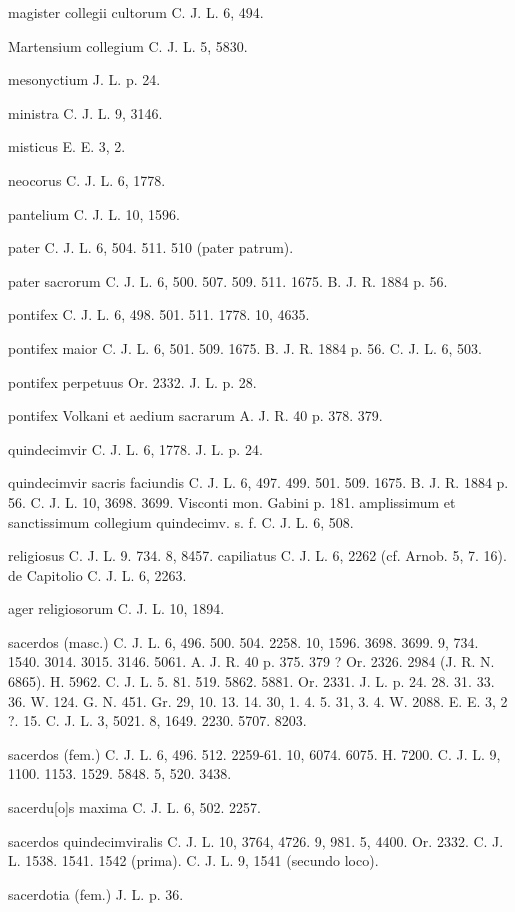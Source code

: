 \documentclass[a4paper, 11pt, oneside, polutonikogreek, german]{article}
\begin{document}
magister collegii cultorum C. J. L. 6, 494.

Martensium collegium C. J. L. 5, 5830.

mesonyctium J. L. p. 24.

ministra C. J. L. 9, 3146.

misticus E. E. 3, 2.

neocorus C. J. L. 6, 1778.

pantelium C. J. L. 10, 1596.

pater C. J. L. 6, 504. 511. 510 (pater patrum).

pater sacrorum C. J. L. 6, 500. 507. 509. 511. 1675. B. J. R. 1884 p. 56.

pontifex C. J. L. 6, 498. 501. 511. 1778. 10, 4635.

pontifex maior C. J. L. 6, 501. 509. 1675. B. J. R. 1884 p. 56. C. J. L. 6, 503.

pontifex perpetuus Or. 2332. J. L. p. 28.

pontifex Volkani et aedium sacrarum A. J. R. 40 p. 378. 379.

quindecimvir C. J. L. 6, 1778. J. L. p. 24.

quindecimvir sacris faciundis C. J. L. 6, 497. 499. 501. 509. 1675. B. J. R. 1884 p. 56. C. J. L. 10, 3698. 3699. Visconti mon. Gabini p. 181. amplissimum et sanctissimum collegium quindecimv. s. f. C. J. L. 6, 508.

religiosus C. J. L. 9. 734. 8, 8457. capiliatus C. J. L. 6, 2262 (cf. Arnob. 5, 7. 16). de Capitolio C. J. L. 6, 2263.

ager religiosorum C. J. L. 10, 1894.

sacerdos (masc.) C. J. L. 6, 496. 500. 504. 2258. 10, 1596. 3698. 3699. 9, 734. 1540. 3014. 3015. 3146. 5061. A. J. R. 40 p. 375. 379 ? Or. 2326. 2984 (J. R. N. 6865). H. 5962. C. J. L. 5. 81. 519. 5862. 5881. Or. 2331. J. L. p. 24. 28. 31. 33. 36. W. 124. G. N. 451. Gr. 29, 10. 13. 14. 30, 1. 4. 5. 31, 3. 4. W. 2088. E. E. 3, 2 ?. 15. C. J. L. 3, 5021. 8, 1649. 2230. 5707. 8203.

sacerdos (fem.) C. J. L. 6, 496. 512. 2259-61. 10, 6074. 6075. H. 7200. C. J. L. 9, 1100. 1153. 1529. 5848. 5, 520. 3438.

sacerdu[o]s maxima C. J. L. 6, 502. 2257.

sacerdos quindecimviralis C. J. L. 10, 3764, 4726. 9, 981. 5, 4400. Or. 2332. C. J. L. 1538. 1541. 1542 (prima). C. J. L. 9, 1541 (secundo loco).

sacerdotia (fem.) J. L. p. 36.
\end{document}
